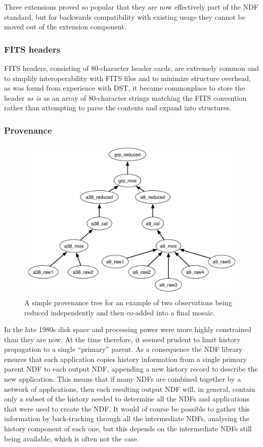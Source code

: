 \documentclass[final,authoryear,5p,times,twocolumn]{elsarticle}
\begin{document}
Three extensions proved so popular that they are now effectively part of the NDF
standard, but for backwards compatibility with existing usage they
cannot be moved out of the extension component.

\subsubsection{FITS headers}

FITS headers, consisting of 80-character header cards, are extremely
common and to simplify interoperability with FITS files and to
minimize structure overhead, as was found from experience with DST,
it became commonplace to store the header \emph{as is}
as an array of 80-character strings matching the FITS
convention rather than attempting to parse the contents and expand
into structures.

\subsubsection{Provenance}
\label{sec:provenance}

\begin{figure}
\includegraphics[width=\columnwidth]{provenance.pdf}
\caption{A simple provenance tree for an example of two observations
  being reduced independently and then co-added into a final
  mosaic.}
\label{fig:prov}
\end{figure}

In the late 1980s disk space and processing power were more highly
constrained than they are now. At the time therefore, it
seemed prudent to limit history propagation to a single ``primary''
parent.  As a consequence the NDF library ensures that each application
copies history information from a single primary parent NDF to each
output NDF, appending a new history record to describe the new
application. This means that if many NDFs are combined together by a
network of applications, then each resulting output NDF will, in
general, contain only a subset of the history needed to determine all
the NDFs and applications that were used to create the NDF. It would
of course be possible to gather this information by back-tracking
through all the intermediate NDFs, analysing the history component of
each one, but this depends on the intermediate NDFs still being
available, which is often not the case.
\end{document}
